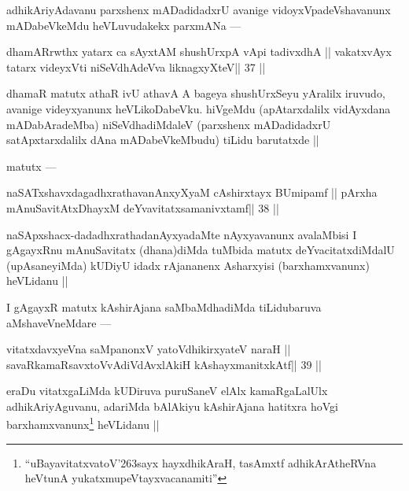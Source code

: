 \begin{artha}
adhikAriyAdavanu parxshenx mADadidadxrU avanige vidoyxVpadeVshavanunx mADabeVkeMdu heVLuvudakekx parxmANa ---
\end{artha}

\begin{shl}
dhamARrwthx yatarx ca sAyxtAM shushUrxpA vA\s pi tadivxdhA ||
vakatxvAyx tatarx videyxVti niSeVdhAdeVva liknagxyXteV\hfill || 37 ||
\end{shl}

\begin{artha}
dhamaR matutx athaR ivU athavA A bageya shushUrxSeyu yAralilx iruvudo, avanige videyxyanunx heVLikoDabeVku. hiVgeMdu (apAtarxdalilx vidAyxdana mADabAradeMba) niSeVdhadiMdaleV (parxshenx mADadidadxrU satApxtarxdalilx dAna mADabeVkeMbudu) tiLidu barutatxde ||
\end{artha}

\begin{artha}
matutx ---
\end{artha}

\begin{shl}
\footnotemark[7]naSATxshavxdagadhxrathavanAnxyXyaM cA\s\s shirxtayx BUmipamf ||
pArxha mAnuSavitAtxDhayxM deYvavitatxsamanivxtamf\hfill || 38 ||
\end{shl}

\begin{artha}
naSApxshacx-dadadhxrathadanAyxyadaMte nAyxyavanunx avalaMbisi I gAgayxRnu mAnuSavitatx (dhana)diMda tuMbida matutx deYvacitatxdiMdalU (upAsaneyiMda) kUDiyU idadx rAjananenx Asharxyisi (barxhamxvanunx) heVLidanu ||
\end{artha}

\begin{artha}
I gAgayxR matutx kAshirAjana saMbaMdhadiMda tiLidubaruva aMshaveVneMdare ---
\end{artha} 

\begin{shl}
vitatxdavxyeVna saMpanonxV yatoV\s dhikirxyateV naraH ||
savaRkamaRsavxtoV\s vAdiVdAvxlAkiH kAshayxmanitxkAtf\hfill || 39 ||
\end{shl}

\begin{artha}
eraDu vitatxgaLiMda kUDiruva puruSaneV elAlx kamaRgaLalUlx adhikAriyAguvanu, adariMda bAlAkiyu kAshirAjana hatitxra hoVgi barxhamxvanunx\footnote[8]{``uBayavitatxvatoV\char'263sayx hayxdhikAraH, tasAmxtf adhikArAtheRVna heVtunA yukatxmupeVtayxvacanamiti''} heVLidanu ||
\end{artha}

